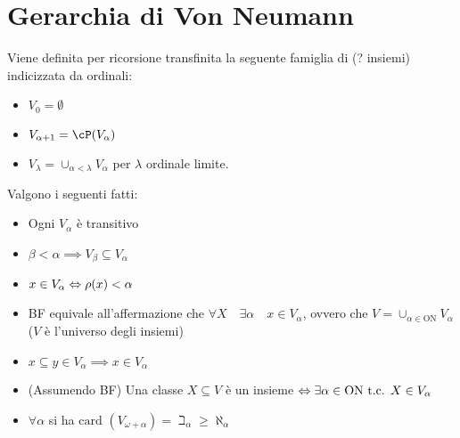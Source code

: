 \documentclass[a4paper,NoNotes,GeneralMath]{stdmdoc}
\newcommand{\card}[1]{\text{card }({#1})}
\newcommand{\ON}{\text{ON}}
\begin{document}
	\section*{Gerarchia di Von Neumann}
	Viene definita per ricorsione transfinita la seguente famiglia di (? insiemi) indicizzata da ordinali:
	\begin{itemize}
		\item $V_0 = \emptyset$
		\item $V_{\alpha + 1} = \cP(V_\alpha)$
		\item $V_\lambda = \cup_{\alpha < \lambda} V_\alpha$ per $\lambda$ ordinale limite.
	\end{itemize}
	Valgono i seguenti fatti:
	\begin{itemize}
		\item Ogni $V_\alpha$ è transitivo
		\item $\beta < \alpha \implies V_\beta \subseteq V_\alpha$
		\item $x \in V_\alpha \Leftrightarrow \rho(x) < \alpha$
		\item BF equivale all'affermazione che $\forall X \quad \exists \alpha \quad x \in V_\alpha$, ovvero che $V = \cup_{\alpha \in \ON} V_\alpha$ ($V$ è l'universo degli insiemi)
		\item $x \subseteq y \in V_\alpha \implies x \in V_\alpha$
		\item (Assumendo BF) Una classe $X \subseteq V$ è un insieme $\sse \exists \alpha \in \ON \tc X \in V_\alpha$
		\item $\forall \alpha$ si ha $\card{V_{\omega + \alpha}} = \beth_\alpha \ge \aleph_\alpha$
	\end{itemize}
	
\end{document}
